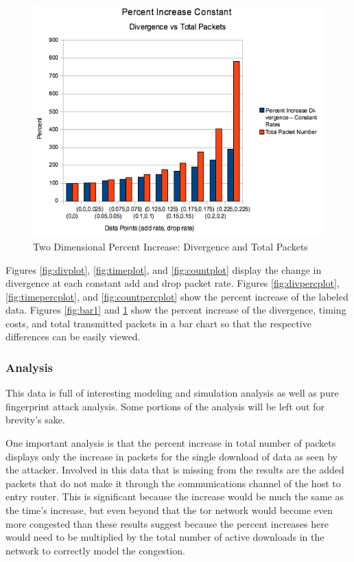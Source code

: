 \documentclass{usenixsubmit}
\begin{document}
\begin{figure}
	\centering
		\includegraphics[scale=0.55]{../../code/plots/perc_increase_div_tpacks_constant.png}
	\caption{Two Dimensional Percent Increase: Divergence and Total Packets}
	\label{fig:bar2}
\end{figure}
Figures \ref{fig:divplot}, \ref{fig:timeplot}, and \ref{fig:countplot} 
display the change in divergence at each constant add and drop
packet rate. Figures \ref{fig:divpercplot}, \ref{fig:timepercplot}, and 
\ref{fig:countpercplot} show the percent increase of the labeled data. 
Figures \ref{fig:bar1} and \ref{fig:bar2} show the percent 
increase of the divergence, timing costs, and total transmitted packets in a 
bar chart so that the respective differences can be easily viewed. 

\subsubsection{Analysis}
This data is full of interesting modeling and simulation analysis as well as 
pure fingerprint attack analysis. Some portions of the analysis will be left 
out for brevity's sake.

One important analysis is that the percent increase in total number of packets
displays only the increase in packets for the single download of data as seen
by the attacker. Involved in this data that is missing from the results are 
the added packets that do not make it through the communications channel of the
host to entry router. This is significant because the increase would be much
the same as the time's increase, but even beyond that the tor network would 
become even more congested than these results suggest because the percent
increases here would need to be multiplied by the total number of active 
downloads in the network to correctly model the congestion. 
\end{document}

